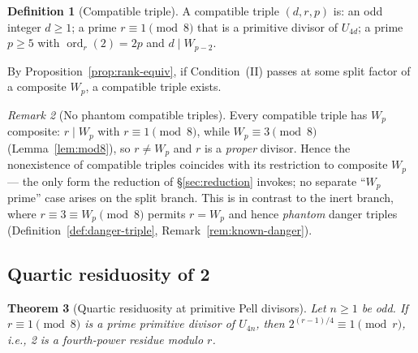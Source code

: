 \documentclass[11pt]{amsart}
\theoremstyle{plain}
\newtheorem{theorem}{Theorem}[section]
\theoremstyle{definition}
\newtheorem{definition}[theorem]{Definition}
\theoremstyle{remark}
\newtheorem{remark}[theorem]{Remark}
\numberwithin{equation}{section}
\newcommand{\ord}{\operatorname{ord}}
\begin{document}
\begin{definition}[Compatible triple]\label{def:compat-triple}
A compatible triple $(d, r, p)$ is: an odd integer $d \geq 1$; a prime $r \equiv 1 \pmod 8$ that is a primitive divisor of $U_{4d}$; a prime $p \geq 5$ with $\ord_r(2) = 2p$ and $d \mid W_{p-2}$.
\end{definition}

By Proposition~\ref{prop:rank-equiv}, if Condition~(II) passes at some split factor of a composite $W_p$, a compatible triple exists.

\begin{remark}[No phantom compatible triples]\label{rem:no-phantom-split}
Every compatible triple has $W_p$ composite: $r \mid W_p$ with $r \equiv 1 \pmod 8$, while $W_p \equiv 3 \pmod 8$ (Lemma~\ref{lem:mod8}), so $r \neq W_p$ and $r$ is a \emph{proper} divisor. Hence the nonexistence of compatible triples coincides with its restriction to composite $W_p$ --- the only form the reduction of \S\ref{sec:reduction} invokes; no separate ``$W_p$ prime'' case arises on the split branch. This is in contrast to the inert branch, where $r \equiv 3 \equiv W_p \pmod 8$ permits $r = W_p$ and hence \emph{phantom} danger triples (Definition~\ref{def:danger-triple}, Remark~\ref{rem:known-danger}).
\end{remark}

\subsection{Quartic residuosity of 2}

\begin{theorem}[Quartic residuosity at primitive Pell divisors]\label{thm:quartic}
Let $n \geq 1$ be odd. If $r \equiv 1 \pmod 8$ is a prime primitive divisor of $U_{4n}$, then $2^{(r-1)/4} \equiv 1 \pmod r$, i.e., 2 is a fourth-power residue modulo $r$.
\end{theorem}
\end{document}
